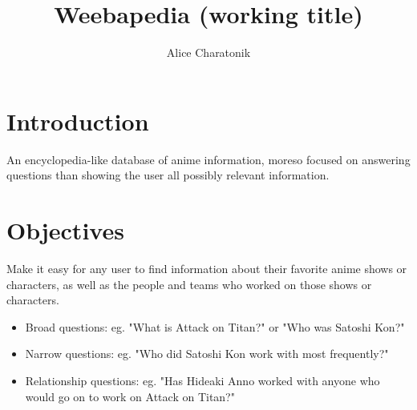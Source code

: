 \documentclass[a4paper]{article}
\title{Weebapedia (working title)}
\author{Alice Charatonik}
\date{}
\begin{document}
\maketitle

\section{Introduction}
An encyclopedia-like database of anime information, moreso focused on answering questions than showing the user all possibly relevant information.

\section{Objectives}
Make it easy for any user to find information about their favorite anime shows or characters, as well as the people and teams who worked on those shows or characters.
\begin{itemize}
  \item Broad questions: eg. "What is Attack on Titan?" or "Who was Satoshi Kon?"
  \item Narrow questions: eg. "Who did Satoshi Kon work with most frequently?"
  \item Relationship questions: eg. "Has Hideaki Anno worked with anyone who would go on to work on Attack on Titan?"
\end{itemize}
\end{document}
